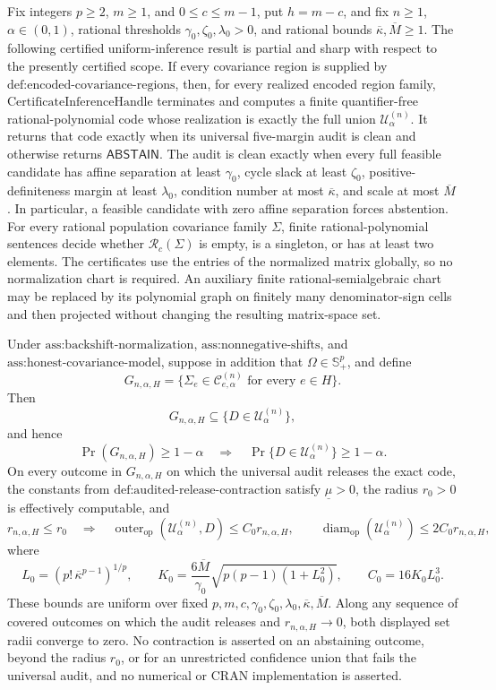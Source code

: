 Fix integers \(p\geq2\), \(m\geq1\), and \(0\leq c\leq m-1\), put \(h=m-c\), and fix \(n\geq1\), \(\alpha\in(0,1)\), rational thresholds \(\gamma_0,\zeta_0,\lambda_0>0\), and rational bounds \(\overline\kappa,\overline M\geq1\). The following certified uniform-inference result is partial and sharp with respect to the presently certified scope. If every covariance region is supplied by \(\text{def:encoded-covariance-regions}\), then, for every realized encoded region family, \(\text{CertificateInferenceHandle}\) terminates and computes a finite quantifier-free rational-polynomial code whose realization is exactly the full union \(\mathcal U^{(n)}_\alpha\). It returns that code exactly when its universal five-margin audit is clean and otherwise returns \(\mathsf{ABSTAIN}\). The audit is clean exactly when every full feasible candidate has affine separation at least \(\gamma_0\), cycle slack at least \(\zeta_0\), positive-definiteness margin at least \(\lambda_0\), condition number at most \(\overline\kappa\), and scale at most \(\overline M\). In particular, a feasible candidate with zero affine separation forces abstention. For every rational population covariance family \(\Sigma\), finite rational-polynomial sentences decide whether \(\mathcal R_c(\Sigma)\) is empty, is a singleton, or has at least two elements. The certificates use the entries of the normalized matrix globally, so no normalization chart is required. An auxiliary finite rational-semialgebraic chart may be replaced by its polynomial graph on finitely many denominator-sign cells and then projected without changing the resulting matrix-space set.

Under \(\text{ass:backshift-normalization}\), \(\text{ass:nonnegative-shifts}\), and \(\text{ass:honest-covariance-model}\), suppose in addition that \(\Omega\in\mathbb S_+^p\), and define
\[
G_{n,\alpha,H}
=\{\Sigma_e\in\mathcal C^{(n)}_{e,\alpha}\text{ for every }e\in H\}.
\]
Then
\[
G_{n,\alpha,H}\subseteq\{D\in\mathcal U^{(n)}_\alpha\},
\]
and hence
\[
\Pr(G_{n,\alpha,H})\geq1-\alpha
\quad\Longrightarrow\quad
\Pr\{D\in\mathcal U^{(n)}_\alpha\}\geq1-\alpha.
\]
On every outcome in \(G_{n,\alpha,H}\) on which the universal audit releases the exact code, the constants from \(\text{def:audited-release-contraction}\) satisfy \(\underline\mu>0\), the radius \(r_0>0\) is effectively computable, and
\[
r_{n,\alpha,H}\leq r_0
\quad\Longrightarrow\quad
\operatorname{outer}_{\mathrm{op}}(\mathcal U^{(n)}_\alpha,D)
\leq C_0r_{n,\alpha,H},
\qquad
\operatorname{diam}_{\mathrm{op}}(\mathcal U^{(n)}_\alpha)
\leq2C_0r_{n,\alpha,H},
\]
where
\[
L_0=(p!\,\overline\kappa^{p-1})^{1/p},\qquad
K_0=\frac{6\overline M}{\gamma_0}\sqrt{p(p-1)(1+L_0^2)},
\qquad
C_0=16K_0L_0^3.
\]
These bounds are uniform over fixed \(p,m,c,\gamma_0,\zeta_0,\lambda_0,\overline\kappa,\overline M\). Along any sequence of covered outcomes on which the audit releases and \(r_{n,\alpha,H}\to0\), both displayed set radii converge to zero. No contraction is asserted on an abstaining outcome, beyond the radius \(r_0\), or for an unrestricted confidence union that fails the universal audit, and no numerical or CRAN implementation is asserted.